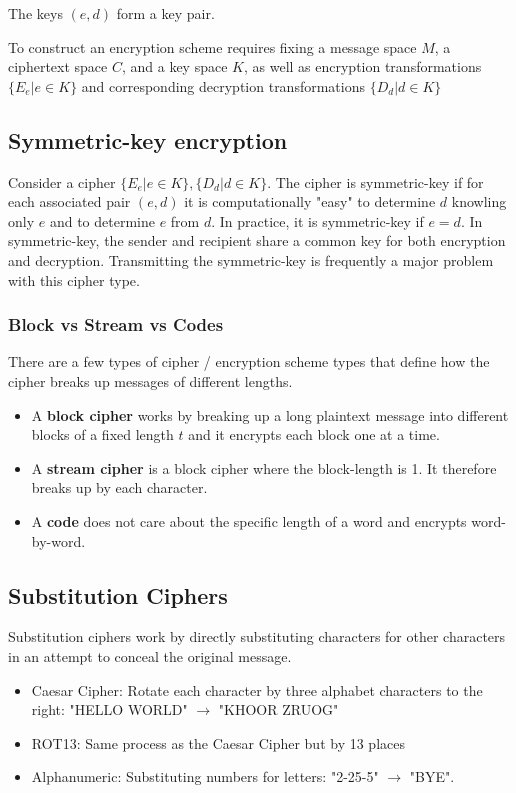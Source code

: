 \documentclass[11pt]{article}
\begin{document}
The keys $(e,d)$ form a key pair.

To construct an encryption scheme requires fixing a message space $M$, a ciphertext space $C$, and a key space $K$, as well as encryption transformations $\{ E_e | e \in K \}$ and corresponding decryption transformations $\{ D_d | d \in K  \}$

\subsection{Symmetric-key encryption}
Consider a cipher $\{ E_e | e \in K \}, \{ D_d | d \in K  \}$.
The cipher is symmetric-key if for each associated pair $(e,d)$ it is computationally "easy" to determine $d$ knowling only $e$ and to determine $e$ from $d$.
In practice, it is symmetric-key if $e=d$.
In symmetric-key, the sender and recipient share a common key for both encryption and decryption.
Transmitting the symmetric-key is frequently a major problem with this cipher type.

\subsubsection{Block vs Stream vs Codes}
There are a few types of cipher / encryption scheme types that define how the cipher breaks up messages of different lengths.
\begin{itemize}
    \item A \textbf{block cipher} works by breaking up a long plaintext message into different blocks of a fixed length $t$ and it encrypts each block one at a time.
    \item A \textbf{stream cipher} is a block cipher where the block-length is 1. It therefore breaks up by each character.
    \item A \textbf{code} does not care about the specific length of a word and encrypts word-by-word.
\end{itemize}

\subsection{Substitution Ciphers}

Substitution ciphers work by directly substituting characters for other characters in an attempt to conceal the original message.
\begin{itemize}
    \item Caesar Cipher: Rotate each character by three alphabet characters to the right: "HELLO WORLD" $\longrightarrow$ "KHOOR ZRUOG"
    \item ROT13: Same process as the Caesar Cipher but by 13 places
    \item Alphanumeric: Substituting numbers for letters: "2-25-5" $\longrightarrow$ "BYE".
\end{itemize}
\end{document}
